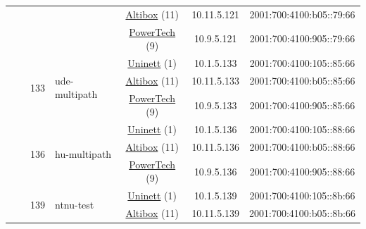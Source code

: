 \begin{small}
\begin{center}
\begin{longtable}{|c|c|c|c|c|c|c|c|}
  &  &  &  & \multicolumn{2}{|c|}{\tiny{\href{https://www.altibox.no}{Altibox} (11)}} & \tiny{10.11.5.121} & \tiny{2001:700:4100:b05::79:66} \\* \cline{5-5}\cline{6-6}\cline{7-7}\cline{8-8}
  &  &  &  & \multicolumn{2}{|c|}{\tiny{\href{http://www.powertech.no}{PowerTech} (9)}} & \tiny{10.9.5.121} & \tiny{2001:700:4100:905::79:66} \\* \cline{3-3}\cline{4-4}\cline{5-5}\cline{6-6}\cline{7-7}\cline{8-8}
  &  & \multirow{3}{*}{\tiny{133}} & \multicolumn{1}{|l|}{\multirow{3}{*}{\tiny{ude-multipath}}} & \multicolumn{2}{|c|}{\tiny{\href{https://www.uninett.no}{Uninett} (1)}} & \tiny{10.1.5.133} & \tiny{2001:700:4100:105::85:66} \\* \cline{5-5}\cline{6-6}\cline{7-7}\cline{8-8}
  &  &  &  & \multicolumn{2}{|c|}{\tiny{\href{https://www.altibox.no}{Altibox} (11)}} & \tiny{10.11.5.133} & \tiny{2001:700:4100:b05::85:66} \\* \cline{5-5}\cline{6-6}\cline{7-7}\cline{8-8}
  &  &  &  & \multicolumn{2}{|c|}{\tiny{\href{http://www.powertech.no}{PowerTech} (9)}} & \tiny{10.9.5.133} & \tiny{2001:700:4100:905::85:66} \\* \cline{3-3}\cline{4-4}\cline{5-5}\cline{6-6}\cline{7-7}\cline{8-8}
  &  & \multirow{3}{*}{\tiny{136}} & \multicolumn{1}{|l|}{\multirow{3}{*}{\tiny{hu-multipath}}} & \multicolumn{2}{|c|}{\tiny{\href{https://www.uninett.no}{Uninett} (1)}} & \tiny{10.1.5.136} & \tiny{2001:700:4100:105::88:66} \\* \cline{5-5}\cline{6-6}\cline{7-7}\cline{8-8}
  &  &  &  & \multicolumn{2}{|c|}{\tiny{\href{https://www.altibox.no}{Altibox} (11)}} & \tiny{10.11.5.136} & \tiny{2001:700:4100:b05::88:66} \\* \cline{5-5}\cline{6-6}\cline{7-7}\cline{8-8}
  &  &  &  & \multicolumn{2}{|c|}{\tiny{\href{http://www.powertech.no}{PowerTech} (9)}} & \tiny{10.9.5.136} & \tiny{2001:700:4100:905::88:66} \\* \cline{3-3}\cline{4-4}\cline{5-5}\cline{6-6}\cline{7-7}\cline{8-8}
  &  & \multirow{3}{*}{\tiny{139}} & \multicolumn{1}{|l|}{\multirow{3}{*}{\tiny{ntnu-test}}} & \multicolumn{2}{|c|}{\tiny{\href{https://www.uninett.no}{Uninett} (1)}} & \tiny{10.1.5.139} & \tiny{2001:700:4100:105::8b:66} \\* \cline{5-5}\cline{6-6}\cline{7-7}\cline{8-8}
  &  &  &  & \multicolumn{2}{|c|}{\tiny{\href{https://www.altibox.no}{Altibox} (11)}} & \tiny{10.11.5.139} & \tiny{2001:700:4100:b05::8b:66} \\* \cline{5-5}\cline{6-6}\cline{7-7}\cline{8-8}

\end{longtable}
\end{center}
\end{small}
